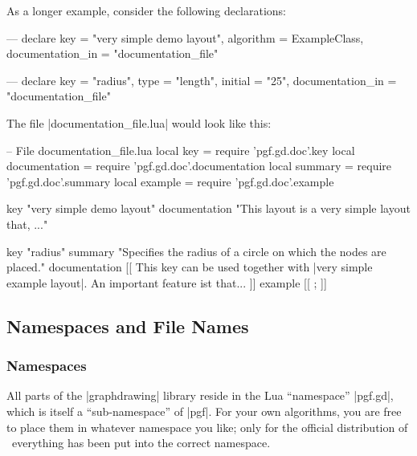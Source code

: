 
As a longer example, consider the following declarations:
%
\begin{codeexample}[code only, tikz syntax=false]
---
declare {
  key               = "very simple demo layout",
  algorithm         = ExampleClass,
  documentation_in  = "documentation_file"
}

---
declare {
  key               = "radius",
  type              = "length",
  initial           = "25",
  documentation_in  = "documentation_file"
}
\end{codeexample}

The file |documentation_file.lua| would look like this:
%
\begin{codeexample}[code only, tikz syntax=false]
-- File documentation_file.lua
local key           = require 'pgf.gd.doc'.key
local documentation = require 'pgf.gd.doc'.documentation
local summary       = require 'pgf.gd.doc'.summary
local example       = require 'pgf.gd.doc'.example

key           "very simple demo layout"
documentation "This layout is a very simple layout that, ..."

key           "radius"
summary       "Specifies the radius of a circle on which the nodes are placed."
documentation
[[
This key can be used together with |very simple example layout|. An
important feature ist that...
]]
example
[[
\tikz {};
]]
\end{codeexample}


\subsection{Namespaces and File Names}
\label{section-gd-namespaces}

\subsubsection{Namespaces}

All parts of the |graphdrawing| library reside in the Lua ``namespace''
|pgf.gd|, which is itself a ``sub-namespace'' of |pgf|. For your own
algorithms, you are free to place them in whatever namespace you like; only for
the official distribution of \pgfname\ everything has been put into the correct
namespace.

